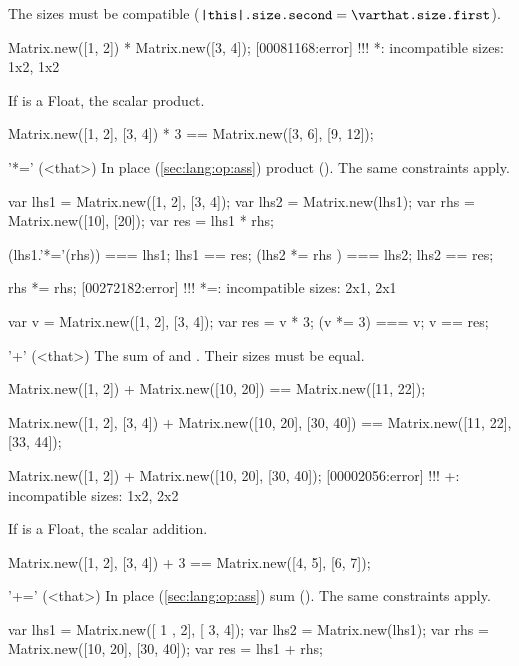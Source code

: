 \begin{urbiscriptapi}
The sizes must be compatible ($\texttt{\this.size.second} =
\texttt{\that.size.first}$).
\begin{urbiscript}
Matrix.new([1, 2]) * Matrix.new([3, 4]);
[00081168:error] !!! *: incompatible sizes: 1x2, 1x2
\end{urbiscript}

  If \that is a Float, the scalar product.
\begin{urbiassert}
Matrix.new([1, 2], [3, 4]) * 3 == Matrix.new([3, 6], [9, 12]);
\end{urbiassert}

\item['*='](<that>)%
  In place (\autoref{sec:lang:op:ass}) product ().  The same
  constraints apply.
\begin{urbiassert}
var lhs1 = Matrix.new([1, 2], [3, 4]);
var lhs2 = Matrix.new(lhs1);
var rhs = Matrix.new([10], [20]);
var res = lhs1 * rhs;

(lhs1.'*='(rhs)) === lhs1;  lhs1 == res;
(lhs2  *=  rhs ) === lhs2;  lhs2 == res;

rhs *= rhs;
[00272182:error] !!! *=: incompatible sizes: 2x1, 2x1
\end{urbiassert}

\begin{urbiassert}
var v = Matrix.new([1, 2], [3, 4]);
var res = v * 3;
(v *= 3) === v; v == res;
\end{urbiassert}


\item['+'](<that>)%
  The sum of \this and \that.  Their sizes must be equal.
\begin{urbiassert}
Matrix.new([1, 2]) + Matrix.new([10, 20])
  == Matrix.new([11, 22]);

Matrix.new([1, 2], [3, 4]) + Matrix.new([10, 20], [30, 40])
  == Matrix.new([11, 22], [33, 44]);

Matrix.new([1, 2]) + Matrix.new([10, 20], [30, 40]);
[00002056:error] !!! +: incompatible sizes: 1x2, 2x2
\end{urbiassert}

  If \that is a Float, the scalar addition.
\begin{urbiassert}
Matrix.new([1, 2], [3, 4]) + 3 == Matrix.new([4, 5], [6, 7]);
\end{urbiassert}


\item['+='](<that>)%
  In place (\autoref{sec:lang:op:ass}) sum ().  The same
  constraints apply.
\begin{urbiassert}
var lhs1 = Matrix.new([ 1 , 2], [ 3,  4]);
var lhs2 = Matrix.new(lhs1);
var rhs = Matrix.new([10, 20], [30, 40]);
var res = lhs1 + rhs;


\end{urbiassert}
\end{urbiscriptapi}
